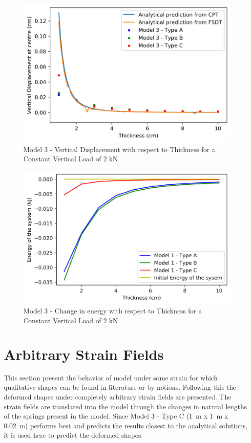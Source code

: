  \begin{figure}[!htbp]
     \centering
     \includegraphics{Figures/M3_t_plt.png}
     \caption{Model 3 - Vertical Displacement with respect to Thickness for a Constant Vertical Load of 2 kN}
     \label{fig:M3_t_plt}
 \end{figure}
 
 \begin{figure}[!htbp]
     \centering
     \includegraphics{Figures/M3_t_energy.png}
     \caption{Model 3 - Change in energy with respect to Thickness for a Constant Vertical Load of 2 kN}
     \label{fig:M3_t_energy}
 \end{figure}
 
 \section{Arbitrary Strain Fields}
 This section present the behavior of model under some strain for which qualitative shapes can be found in literature or by notions. Following this the deformed shapes under completely arbitrary strain fields are presented. The strain fields are translated into the model through the changes in natural lengths of the springs present in the model. Since Model 3 - Type C (1~m x 1~m x 0.02~m) performs best and predicts the results closest to the analytical solutions, it is used here to predict the deformed shapes.
 
